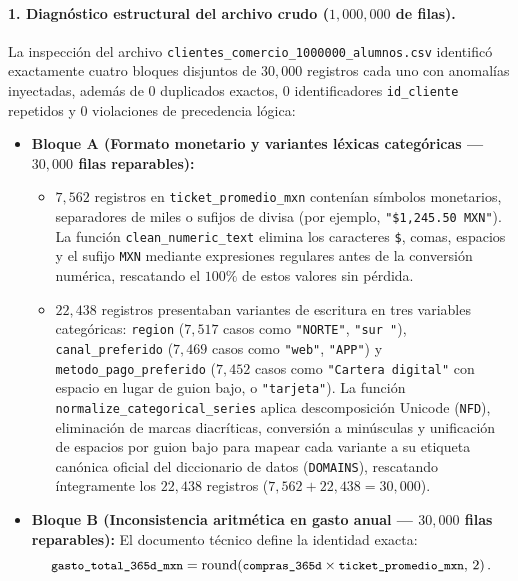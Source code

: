 \documentclass[11pt,a4paper]{article}
\newcommand{\code}[1]{\texttt{\small #1}}
\begin{document}
\paragraph{1. Diagnóstico estructural del archivo crudo ($1{,}000{,}000$ de filas).}
La inspección del archivo \code{clientes\_comercio\_1000000\_alumnos.csv} identificó exactamente cuatro bloques disjuntos de $30{,}000$ registros cada uno con anomalías inyectadas, además de $0$ duplicados exactos, $0$ identificadores \code{id\_cliente} repetidos y $0$ violaciones de precedencia lógica:
\begin{itemize}[noitemsep]
    \item \textbf{Bloque A (Formato monetario y variantes léxicas categóricas --- $30{,}000$ filas reparables):}
    \begin{itemize}[noitemsep]
        \item $7{,}562$ registros en \code{ticket\_promedio\_mxn} contenían símbolos monetarios, separadores de miles o sufijos de divisa (por ejemplo, \code{"\$1,245.50 MXN"}). La función \code{clean\_numeric\_text} elimina los caracteres \code{\$}, comas, espacios y el sufijo \code{MXN} mediante expresiones regulares antes de la conversión numérica, rescatando el $100\%$ de estos valores sin pérdida.
        \item $22{,}438$ registros presentaban variantes de escritura en tres variables categóricas: \code{region} ($7{,}517$ casos como \code{"NORTE"}, \code{"sur "}), \code{canal\_preferido} ($7{,}469$ casos como \code{"web"}, \code{"APP"}) y \code{metodo\_pago\_preferido} ($7{,}452$ casos como \code{"Cartera digital"} con espacio en lugar de guion bajo, o \code{"tarjeta"}). La función \code{normalize\_categorical\_series} aplica descomposición Unicode (\code{NFD}), eliminación de marcas diacríticas, conversión a minúsculas y unificación de espacios por guion bajo para mapear cada variante a su etiqueta canónica oficial del diccionario de datos (\code{DOMAINS}), rescatando íntegramente los $22{,}438$ registros ($7{,}562 + 22{,}438 = 30{,}000$).
    \end{itemize}
    \item \textbf{Bloque B (Inconsistencia aritmética en gasto anual --- $30{,}000$ filas reparables):}
    El documento técnico define la identidad exacta:
    \begin{equation}
        \text{\code{gasto\_total\_365d\_mxn}} = \operatorname{round}\!\left(\text{\code{compras\_365d}} \times \text{\code{ticket\_promedio\_mxn}},\, 2\right).
    \end{equation}

\end{itemize}
\end{document}
